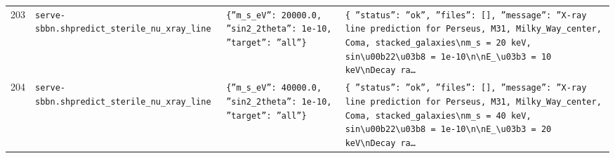 \documentclass[11pt,a4paper]{article}
\begin{document}
\begin{longtable}{@{}p{}p{}p{}p{}@{}}
203 & \texttt{serve-sbbn.sh}\newline\texttt{predict\_\allowbreak{}sterile\_\allowbreak{}nu\_\allowbreak{}xray\_\allowbreak{}line} & \texttt{\{''m\_\allowbreak{}s\_\allowbreak{}eV'':\allowbreak{} 20000.0,\allowbreak{} ''sin2\_\allowbreak{}2theta'':\allowbreak{} 1e-10,\allowbreak{} ''target'':\allowbreak{} ''all''\}\allowbreak{}} & \texttt{\{   ''status'':\allowbreak{} ''ok'',\allowbreak{}   ''files'':\allowbreak{} []\allowbreak{},\allowbreak{}   ''message'':\allowbreak{} ''X-ray line prediction for Perseus,\allowbreak{} M31,\allowbreak{} Milky\_\allowbreak{}Way\_\allowbreak{}center,\allowbreak{} Coma,\allowbreak{} stacked\_\allowbreak{}galaxies\textbackslash{}\allowbreak{}nm\_\allowbreak{}s =\allowbreak{} 20 keV,\allowbreak{} sin\textbackslash{}\allowbreak{}u00b22\textbackslash{}\allowbreak{}u03b8 =\allowbreak{} 1e-10\textbackslash{}\allowbreak{}n\textbackslash{}\allowbreak{}nE\_\allowbreak{}\textbackslash{}\allowbreak{}u03b3 =\allowbreak{} 10 keV\textbackslash{}\allowbreak{}nDecay ra\ldots{}\allowbreak{}} \\
204 & \texttt{serve-sbbn.sh}\newline\texttt{predict\_\allowbreak{}sterile\_\allowbreak{}nu\_\allowbreak{}xray\_\allowbreak{}line} & \texttt{\{''m\_\allowbreak{}s\_\allowbreak{}eV'':\allowbreak{} 40000.0,\allowbreak{} ''sin2\_\allowbreak{}2theta'':\allowbreak{} 1e-10,\allowbreak{} ''target'':\allowbreak{} ''all''\}\allowbreak{}} & \texttt{\{   ''status'':\allowbreak{} ''ok'',\allowbreak{}   ''files'':\allowbreak{} []\allowbreak{},\allowbreak{}   ''message'':\allowbreak{} ''X-ray line prediction for Perseus,\allowbreak{} M31,\allowbreak{} Milky\_\allowbreak{}Way\_\allowbreak{}center,\allowbreak{} Coma,\allowbreak{} stacked\_\allowbreak{}galaxies\textbackslash{}\allowbreak{}nm\_\allowbreak{}s =\allowbreak{} 40 keV,\allowbreak{} sin\textbackslash{}\allowbreak{}u00b22\textbackslash{}\allowbreak{}u03b8 =\allowbreak{} 1e-10\textbackslash{}\allowbreak{}n\textbackslash{}\allowbreak{}nE\_\allowbreak{}\textbackslash{}\allowbreak{}u03b3 =\allowbreak{} 20 keV\textbackslash{}\allowbreak{}nDecay ra\ldots{}\allowbreak{}} \\

\end{longtable}
\end{document}
